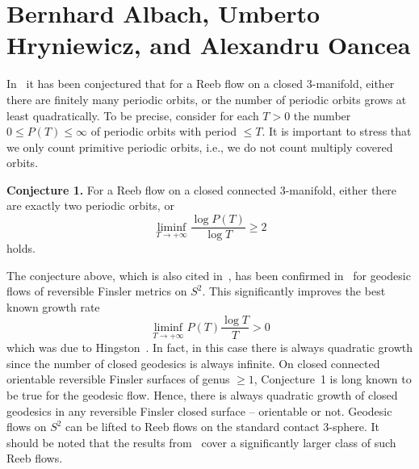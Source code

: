 \documentclass[11pt]{article}
\theoremstyle{definition}
\begin{document}



\section*{Bernhard Albach, Umberto Hryniewicz, and Alexandru Oancea}

In~\cite{Albach} it has been conjectured that for a Reeb flow on a closed $3$-manifold, either there are finitely many periodic orbits, or the number of periodic orbits grows at least quadratically. To be precise, consider for each $T>0$ the number $0\leq P(T)\leq \infty$ of periodic orbits with period $\leq T$. It is important to stress that we only count primitive periodic orbits, i.e., we do not count multiply covered orbits. 

\noindent \textbf{Conjecture 1.} For a Reeb flow on a closed connected $3$-manifold, either there are exactly two periodic orbits, or $$ \liminf_{T\to+\infty} \frac{\log P(T)}{\log T} \geq 2 $$ holds.

The conjecture above, which is also cited in~\cite{DanCG}, has been confirmed in~\cite{Albach} for geodesic flows of reversible Finsler metrics on $S^2$. This significantly improves the best known growth rate $$ \liminf_{T\to+\infty} P(T)\frac{\log T}{T} > 0 $$ which was due to Hingston~\cite{Hingston1993}. In fact, in this case there is always quadratic growth since the number of closed geodesics is always infinite. On closed connected orientable reversible Finsler surfaces of genus $\geq 1$, Conjecture~1 is long known to be true for the geodesic flow. Hence, there is always quadratic growth of closed geodesics in any reversible Finsler closed surface -- orientable or not. Geodesic flows on $S^2$ can be lifted to Reeb flows on the standard contact $3$-sphere. It should be noted that the results from~\cite{Albach} cover a significantly larger class of such Reeb flows.
\end{document}
